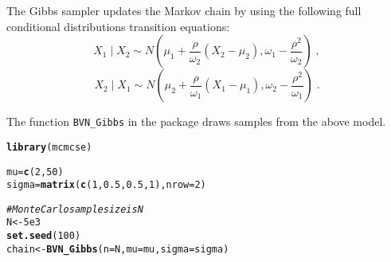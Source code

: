 \documentclass[11pt]{article}\usepackage[]{graphicx}\usepackage[]{color}
\makeatletter
\newcommand{\hlnum}[1]{\textcolor[rgb]{0.686,0.059,0.569}{#1}}%
\newcommand{\hlcom}[1]{\textcolor[rgb]{0.678,0.584,0.686}{\textit{#1}}}%
\newcommand{\hlstd}[1]{\textcolor[rgb]{0.345,0.345,0.345}{#1}}%
\newcommand{\hlkwb}[1]{\textcolor[rgb]{0.69,0.353,0.396}{#1}}%
\newcommand{\hlkwc}[1]{\textcolor[rgb]{0.333,0.667,0.333}{#1}}%
\newcommand{\hlkwd}[1]{\textcolor[rgb]{0.737,0.353,0.396}{\textbf{#1}}}%
\newenvironment{kframe}{%
 \def\at@end@of@kframe{}%
 \ifinner\ifhmode%
  \def\at@end@of@kframe{\end{minipage}}%
  \begin{minipage}{\columnwidth}%
 \fi\fi%
 \def\FrameCommand##1{\hskip\@totalleftmargin \hskip-\fboxsep
 \colorbox{shadecolor}{##1}\hskip-\fboxsep
     \hskip-\linewidth \hskip-\@totalleftmargin \hskip\columnwidth}%
 \MakeFramed {\advance\hsize-\width
   \@totalleftmargin\z@ \linewidth\hsize
   \@setminipage}}%
 {\par\unskip\endMakeFramed%
 \at@end@of@kframe}
\newenvironment{knitrout}{}{} %
\makeatother
\begin{document}
The Gibbs sampler updates the Markov chain by using the following full conditional distributions transition equations:
\[
X_{1} \mid X_{2} \sim  N\left(\mu_{1} + \dfrac{\rho}{\omega_2}\left(X_{2} - \mu_{2}\right) , \omega_1 - \dfrac{\rho^{2}}{\omega_2}\right) \; ,
\]
\[
X_{2} \mid X_{1} \sim  N\left(\mu_{2} + \dfrac{\rho}{\omega_1}\left(X_{1} - \mu_{1}\right) , \omega_2 - \dfrac{\rho^{2}}{\omega_1}\right) \; .
\]

The function \texttt{BVN\_Gibbs} in the package draws samples from the above model. 

\begin{knitrout}
\color{fgcolor}\begin{kframe}
\begin{alltt}
\hlkwd{library}\hlstd{(mcmcse)}
\end{alltt}


{\ttfamily\noindent\itshape{}}\begin{alltt}
\hlstd{mu} \hlkwb{=} \hlkwd{c}\hlstd{(}\hlnum{2}\hlstd{,} \hlnum{50}\hlstd{)}
\hlstd{sigma} \hlkwb{=} \hlkwd{matrix}\hlstd{(}\hlkwd{c}\hlstd{(}\hlnum{1}\hlstd{,} \hlnum{0.5}\hlstd{,} \hlnum{0.5}\hlstd{,} \hlnum{1}\hlstd{),} \hlkwc{nrow} \hlstd{=} \hlnum{2}\hlstd{)}

\hlcom{# Monte Carlo sample size is N}
\hlstd{N} \hlkwb{<-} \hlnum{5e3}
\hlkwd{set.seed}\hlstd{(}\hlnum{100}\hlstd{)}
\hlstd{chain} \hlkwb{<-} \hlkwd{BVN_Gibbs}\hlstd{(}\hlkwc{n} \hlstd{= N,} \hlkwc{mu} \hlstd{= mu,} \hlkwc{sigma} \hlstd{= sigma)}
\end{alltt}


{\ttfamily\noindent\bfseries{}}\end{kframe}
\end{knitrout}
\end{document}
